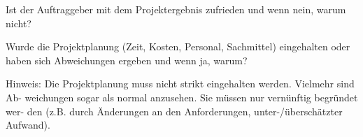 \documentclass[a4paper,12pt]{article}
\begin{document}
Ist der Auftraggeber mit dem Projektergebnis zufrieden und wenn nein, warum
nicht?

Wurde die Projektplanung (Zeit, Kosten, Personal, Sachmittel) eingehalten oder
haben sich Abweichungen ergeben und wenn ja, warum?

Hinweis: Die Projektplanung muss nicht strikt eingehalten werden. Vielmehr sind
Ab- weichungen sogar als normal anzusehen. Sie müssen nur vernünftig begründet
wer- den (z.B. durch Änderungen an den Anforderungen, unter-/überschätzter
Aufwand).

\newpage
\printbibliography
\end{document}
